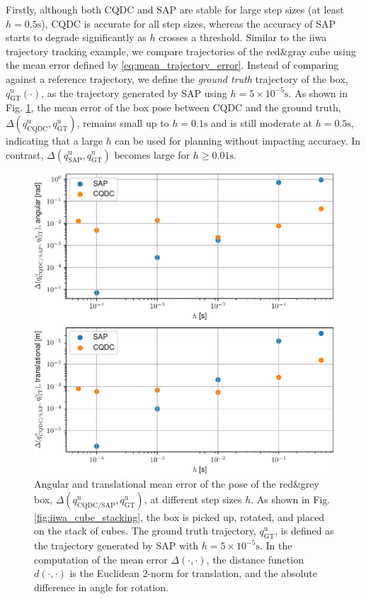 Firstly, although both CQDC and SAP are stable for large step sizes (at least $h=0.5\mathrm{s}$), CQDC is accurate for all step sizes, whereas the accuracy of SAP starts to degrade significantly as $h$ crosses a threshold. 
Similar to the iiwa trajectory tracking example, we compare trajectories of the red\&gray cube using the mean error defined by \eqref{eq:mean_trajectory_error}. Instead of comparing against a reference trajectory, we define the \emph{ground truth} trajectory of the box, $q_\mathrm{GT}^\mathrm{u}(\cdot)$, as the trajectory generated by SAP using $h=5 \times 10^{-5} \mathrm{s}$.
As shown in Fig. \ref{fig:error_vs_time_step}, the mean error of the box pose between CQDC and the ground truth, $\Delta (q_\mathrm{CQDC}^\mathrm{u}, q_\mathrm{GT}^\mathrm{u})$, remains small up to $h=0.1\mathrm{s}$ and is still moderate at $h=0.5\mathrm{s}$, indicating that a large $h$ can be used for planning without impacting accuracy.
In contrast, $\Delta (q_\mathrm{SAP}^\mathrm{u}, q_\mathrm{GT}^\mathrm{u})$ becomes large for $h \geq 0.01 \mathrm{s}$.
\begin{figure}
\centering
\includegraphics[width=0.8\linewidth]{figures/02_quasi_static_dynamics/error_vs_time_step.pdf}
\caption{Angular and translational mean error of the pose of the red\&grey box, $\Delta (q_\mathrm{CQDC/SAP}^\mathrm{u}, q_\mathrm{GT}^\mathrm{u})$, at different step sizes $h$.
As shown in Fig. \ref{fig:iiwa_cube_stacking}, the box is picked up, rotated, and placed on the stack of cubes.
The ground truth trajectory, $q_\mathrm{GT}^\mathrm{u}$, is defined as the trajectory generated by SAP with $h=5\times10^{-5}\mathrm{s}$.
In the computation of the mean error $\Delta(\cdot, \cdot)$, the distance function $d(\cdot, \cdot)$ is the Euclidean 2-norm for translation, and the absolute difference in angle for rotation.
}
\label{fig:error_vs_time_step}
\end{figure}

